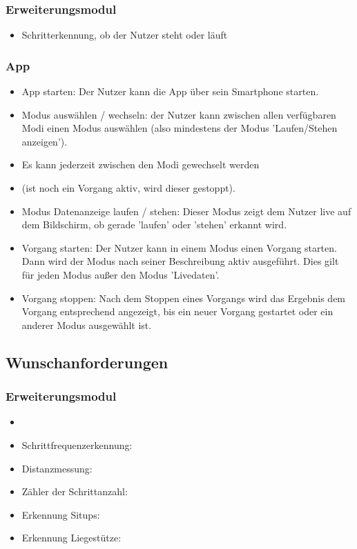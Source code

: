 \documentclass[a4paper,12pt]{article}
\begin{document}
    \subsubsection{Erweiterungsmodul}
    \begin{itemize}
      \item[] Schritterkennung, ob der Nutzer steht oder läuft
    \end{itemize}
    \subsubsection{App}
    \begin{itemize}
      \item[] \textsf{App starten:} Der Nutzer kann die App über sein Smartphone starten. %
      \item[] \textsf{Modus auswählen / wechseln:} der Nutzer kann zwischen allen verfügbaren Modi einen Modus auswählen (also mindestens der Modus 'Laufen/Stehen anzeigen'). 
      \item[] Es kann jederzeit zwischen den Modi gewechselt werden 
      \item[] (ist noch ein Vorgang aktiv, wird dieser gestoppt).
      \item[] \textsf{Modus Datenanzeige laufen / stehen:} Dieser Modus zeigt dem Nutzer live auf dem Bildschirm, ob gerade 'laufen' oder 'stehen' erkannt wird.
      \item[] \textsf{Vorgang starten:} Der Nutzer kann in einem Modus einen Vorgang starten. Dann wird der Modus nach seiner Beschreibung aktiv ausgeführt. Dies gilt für jeden Modus außer den Modus 'Livedaten'.
      \item[] \textsf{Vorgang stoppen:} Nach dem Stoppen eines Vorgangs wird das Ergebnis dem Vorgang entsprechend angezeigt, bis ein neuer Vorgang gestartet oder ein anderer Modus ausgewählt ist.  
    \end{itemize}
  \subsection{Wunschanforderungen}
    \subsubsection{Erweiterungsmodul}
    \begin{itemize}
      \item[] 
      \item[] \textsf{Schrittfrequenzerkennung:} 
      \item[] \textsf{Distanzmessung:}
      \item[] \textsf{Zähler der Schrittanzahl:}
      \item[] \textsf{Erkennung Situps:}
      \item[] \textsf{Erkennung Liegestütze:}   
    \end{itemize}
\end{document}
